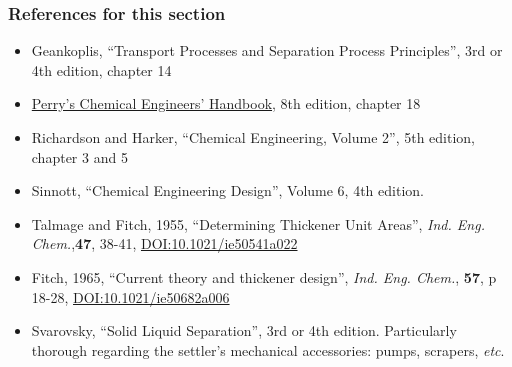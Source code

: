 \begin{frame}\frametitle{References for this section}
	\begin{itemize}
		\item	Geankoplis, ``Transport Processes and Separation Process Principles'', 3rd or 4th edition, chapter 14
		\item	\href{http://accessengineeringlibrary.com/browse/perrys-chemical-engineers-handbook-eighth-edition}{Perry's Chemical Engineers' Handbook}, 8th edition, chapter 18
		\item	Richardson and Harker, ``Chemical Engineering, Volume 2'', 5th edition, chapter 3 and 5
		\item	Sinnott, ``Chemical Engineering Design'', Volume 6, 4th edition.
		\item	Talmage and Fitch, 1955, ``Determining Thickener Unit Areas'', \emph{Ind. Eng. Chem.},\textbf{47}, 38-41, \href{http://dx.doi.org/10.1021/ie50541a022}{\small DOI:10.1021/ie50541a022}
		\item	Fitch, 1965, ``Current theory and thickener design'', \emph{Ind. Eng. Chem.}, \textbf{57}, p 18-28, \href{http://dx.doi.org/10.1021/ie50682a006}{\small DOI:10.1021/ie50682a006}
		\item	Svarovsky, ``Solid Liquid Separation'', 3rd or 4th edition. Particularly thorough regarding the settler's mechanical accessories: pumps, scrapers, \emph{etc}.
	\end{itemize}
\end{frame}

